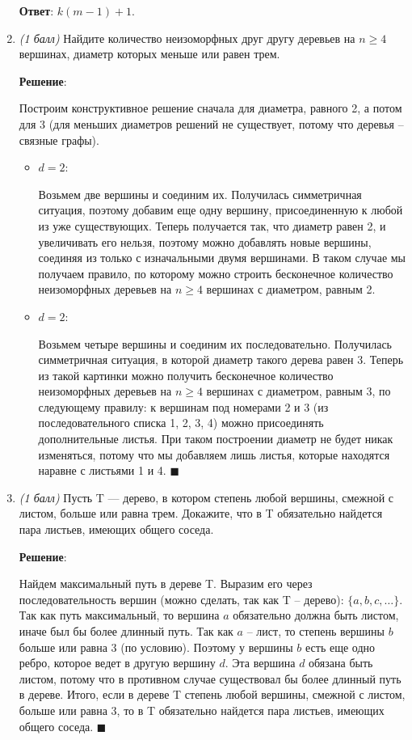 \documentclass{article}
\begin{document}
\begin{enumerate}
    \textbf{Ответ}: $k(m-1)+1$.

    \item \textit{(1 балл)} Найдите количество неизоморфных друг другу деревьев на $n \geq 4$ вершинах, диаметр которых меньше или равен трем.
    
    \textbf{Решение}:
    
    Построим конструктивное решение сначала для диаметра, равного 2, а потом для 3 (для меньших диаметров решений не существует, потому что деревья -- связные графы).
    \begin{itemize}
        \item $d = 2$:
        
        Возьмем две вершины и соединим их. Получилась симметричная ситуация, поэтому добавим еще одну вершину, присоединенную к любой из уже существующих. Теперь получается так, что диаметр равен 2, и увеличивать его нельзя, поэтому можно добавлять новые вершины, соединяя из только с изначальными двумя вершинами. В таком случае мы получаем правило, по которому можно строить бесконечное количество неизоморфных деревьев на $n \geq 4$ вершинах с диаметром, равным 2.

        \item $d = 2$:
        
        Возьмем четыре вершины и соединим их последовательно. Получилась симметричная ситуация, в которой диаметр такого дерева равен 3.  Теперь из такой картинки можно получить бесконечное количество неизоморфных деревьев на $n \geq 4$ вершинах с диаметром, равным 3, по следующему правилу: к вершинам под номерами 2 и 3 (из последовательного списка 1, 2, 3, 4) можно присоединять дополнительные листья. При таком построении диаметр не будет никак изменяться, потому что мы добавляем лишь листья, которые находятся наравне с листьями 1 и 4. $\blacksquare$
    \end{itemize}
    
    \item \textit{(1 балл)} Пусть T — дерево, в котором степень любой вершины, смежной с листом, больше или равна трем. Докажите, что в T обязательно найдется пара листьев, имеющих общего соседа.
    
    \textbf{Решение}:
    
    Найдем максимальный путь в дереве T. Выразим его через последовательность вершин (можно сделать, так как T -- дерево): $\{a, b, c, \dots\}$. Так как путь максимальный, то вершина $a$ обязательно должна быть листом, иначе был бы более длинный путь. Так как $a$ -- лист, то степень вершины $b$ больше или равна 3 (по условию). Поэтому у вершины $b$ есть еще одно ребро, которое ведет в другую вершину $d$. Эта вершина $d$ обязана быть листом, потому что в противном случае существовал бы более длинный путь в дереве. Итого, если в дереве T степень любой вершины, смежной с листом, больше или равна 3, то в T обязательно найдется пара листьев, имеющих общего соседа. $\blacksquare$


\end{enumerate}
\end{document}
